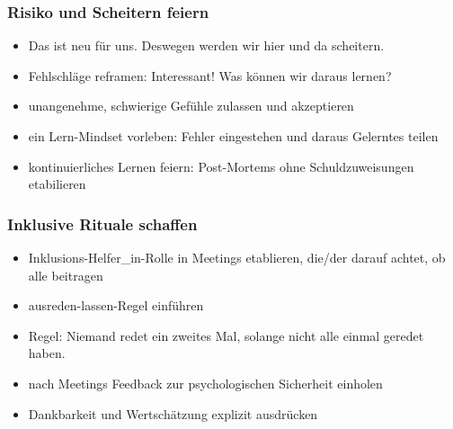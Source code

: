\subsubsection{Risiko und Scheitern feiern}

\begin{itemize}
  \item \glqq Das ist neu für uns. Deswegen werden wir hier und da scheitern.\grqq
  \item Fehlschläge reframen: \glqq Interessant! Was können wir daraus lernen?\grqq
  \item unangenehme, schwierige Gefühle zulassen und akzeptieren
  \item ein Lern-Mindset vorleben: Fehler eingestehen und daraus Gelerntes teilen
  \item kontinuierliches Lernen feiern: Post-Mortems ohne Schuldzuweisungen etabilieren
\end{itemize}


\subsubsection{Inklusive Rituale schaffen}

\begin{itemize}
  \item \glqq Inklusions-Helfer\_in\grqq-Rolle in Meetings etablieren, die/der darauf achtet, ob alle beitragen
  \item \glqq ausreden-lassen\grqq-Regel einführen
  \item Regel: \glqq Niemand redet ein zweites Mal, solange nicht alle einmal geredet haben.\grqq
  \item nach Meetings Feedback zur psychologischen Sicherheit einholen
  \item Dankbarkeit und Wertschätzung explizit ausdrücken
\end{itemize}
